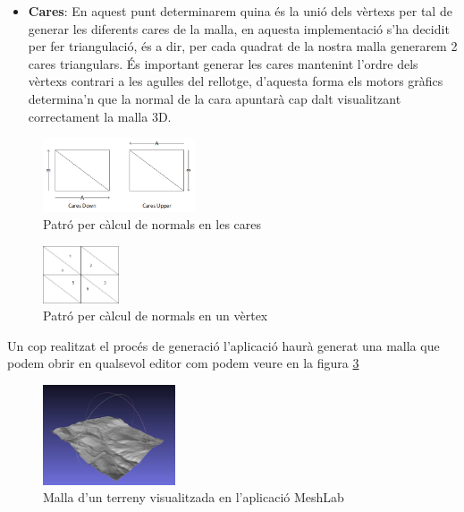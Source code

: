 \documentclass[10pt,a4paper,twocolumn,twoside]{article}
\begin{document}
\begin{itemize}
  \item \textbf{Cares}: En aquest punt determinarem quina és la unió dels vèrtexs per tal de generar les diferents cares de la malla, en aquesta implementació s'ha decidit per fer triangulació, és a dir, per cada quadrat de la nostra malla generarem 2 cares triangulars. És important generar les cares mantenint l'ordre dels vèrtexs contrari a les agulles del rellotge, d'aquesta forma els motors gràfics determina'n que la normal de la cara apuntarà cap dalt visualitzant correctament la malla 3D.
\end{itemize}

\begin{figure}[!h]
\centering
  	\includegraphics[width=0.4\textwidth]{caranormal}
	\caption{Patró per càlcul de normals en les cares}
	\label{fig-normalcara}
\end{figure}

\begin{figure}[!h]
\centering
  	\includegraphics[width=0.2\textwidth]{vertexnormal}
	\caption{Patró per càlcul de normals en un vèrtex}
	\label{fig-normalvertex}
\end{figure}

Un cop realitzat el procés de generació l'aplicació haurà generat una malla que podem obrir en qualsevol editor com podem veure en la figura \ref{fig-meshlab}

\begin{figure}[!h]
\centering
  	\includegraphics[width=0.35\textwidth]{mesh_example_meshlab}
	\caption{Malla d'un terreny visualitzada en l'aplicació MeshLab}
	\label{fig-meshlab}
\end{figure}
\end{document}
